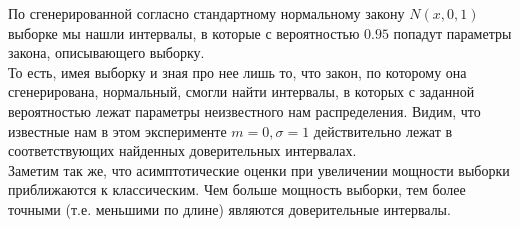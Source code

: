 \documentclass[../body.tex]{subfiles}
\begin{document}
	 По сгенерированной согласно стандартному нормальному закону $N(x, 0, 1)$ выборке мы нашли интервалы, в которые с вероятностью $0.95$ попадут параметры закона, описывающего выборку.\\ То есть, имея выборку и зная про нее лишь то, что закон, по которому она сгенерирована, нормальный, смогли найти интервалы, в которых с заданной вероятностью лежат параметры неизвестного нам распределения.
	 Видим, что известные нам в этом эксперименте $m = 0, \sigma = 1$ действительно лежат в соответствующих найденных доверительных интервалах.\\
	 Заметим так же, что асимптотические оценки при увеличении мощности выборки приближаются к классическим.
	 Чем больше мощность выборки, тем более точными (т.е. меньшими по длине) являются доверительные интервалы.
\end{document}
